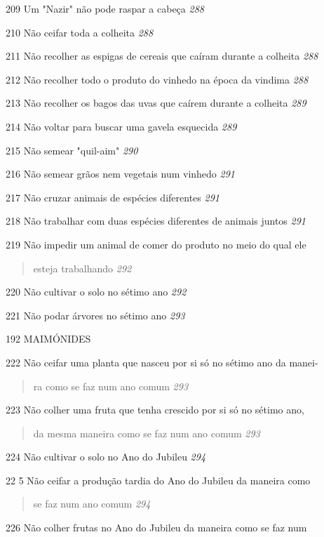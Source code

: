 209 Um "Nazir" não pode raspar a cabeça \emph{288}

210 Não ceifar toda a colheita \emph{288}

211 Não recolher as espigas de cereais que caíram durante a colheita
\emph{288}

212 Não recolher todo o produto do vinhedo na época da vindima
\emph{288}

213 Não recolher os bagos das uvas que caírem durante a colheita
\emph{289}

214 Não voltar para buscar uma gavela esquecida \emph{289}

215 Não semear "quil-aim" \emph{290}

216 Não semear grãos nem vegetais num vinhedo \emph{291}

217 Não cruzar animais de espécies diferentes \emph{291}

218 Não trabalhar com duas espécies diferentes de animais juntos
\emph{291}

219 Não impedir um animal de comer do produto no meio do qual ele

\begin{quote}
esteja trabalhando \emph{292}
\end{quote}

220 Não cultivar o solo no sétimo ano \emph{292}

221 Não podar árvores no sétimo ano \emph{293}

192 MAIMÓNIDES

222 Não ceifar uma planta que nasceu por si só no sétimo ano da manei-

\begin{quote}
ra como se faz num ano comum \emph{293}
\end{quote}

223 Não colher uma fruta que tenha crescido por si só no sétimo ano,

\begin{quote}
da mesma maneira como se faz num ano comum \emph{293}
\end{quote}

224 Não cultivar o solo no Ano do Jubileu \emph{294}

22 5 Não ceifar a produção tardia do Ano do Jubileu da maneira como

\begin{quote}
se faz num ano comum \emph{294}
\end{quote}

226 Não colher frutas no Ano do Jubileu da maneira como se faz num

